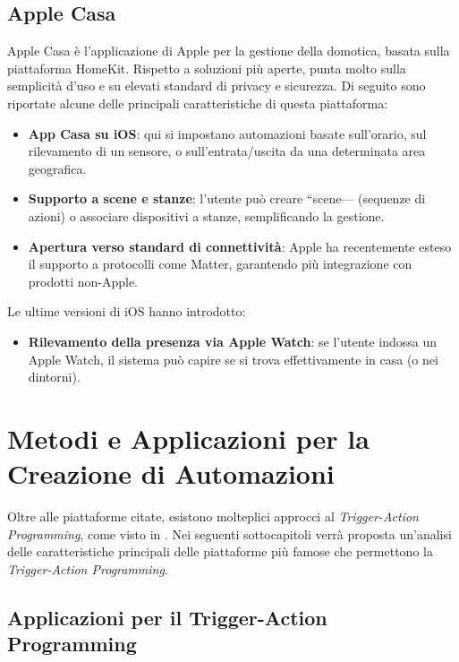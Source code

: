 \subsection{Apple Casa}
Apple Casa è l’applicazione di Apple per la gestione della domotica, basata sulla piattaforma HomeKit. Rispetto a soluzioni più aperte, punta molto sulla semplicità d’uso e su elevati standard di privacy e sicurezza.
Di seguito sono riportate alcune delle principali caratteristiche di questa piattaforma:
\begin{itemize}
  \item \textbf{App Casa su iOS}: qui si impostano automazioni basate sull’orario, sul rilevamento di un sensore, o sull’entrata/uscita da una determinata area geografica.
  \item \textbf{Supporto a scene e stanze}: l’utente può creare “scene— (sequenze di azioni) o associare dispositivi a stanze, semplificando la gestione.
  \item \textbf{Apertura verso standard di connettività}: Apple ha recentemente esteso il supporto a protocolli come Matter, garantendo più integrazione con prodotti non-Apple.
\end{itemize}

Le ultime versioni di iOS hanno introdotto:
\begin{itemize}
  \item \textbf{Rilevamento della presenza via Apple Watch}: se l’utente indossa un Apple Watch, il sistema può capire se si trova effettivamente in casa (o nei dintorni).
\end{itemize}




\section{Metodi e Applicazioni per la Creazione di Automazioni}
Oltre alle piattaforme citate, esistono molteplici approcci al \emph{Trigger-Action Programming}, come visto in \cite{Barricelli2024, Corno2021, Barricelli2022MultiModal}.
Nei seguenti sottocapitoli verrà proposta un’analisi delle caratteristiche principali delle piattaforme più famose che permettono la \emph{Trigger-Action Programming}.


\subsection{Applicazioni per il Trigger-Action Programming}

